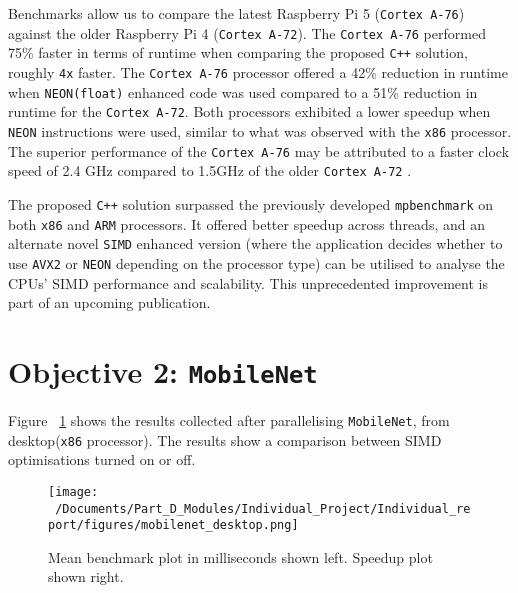 Benchmarks allow us to compare the latest Raspberry Pi 5 (\texttt{Cortex A-76}) against the older Raspberry Pi 4 (\texttt{Cortex A-72}). The \texttt{Cortex A-76} performed 75\% faster in terms of runtime when comparing the proposed \texttt{C++} solution, roughly \texttt{4x} faster. The \texttt{Cortex A-76} processor offered a 42\% reduction in runtime when \texttt{NEON(float)} enhanced code was used compared to a 51\% reduction in runtime for the \texttt{Cortex A-72}. Both processors exhibited a lower speedup when \texttt{NEON} instructions were used, similar to what was observed with the \texttt{x86} processor. The superior performance of the \texttt{Cortex A-76} may be attributed to a faster clock speed of 2.4 GHz compared to 1.5GHz of the older \texttt{Cortex A-72} \cite{rasp_pi5_pi4_comparision}.

The proposed \texttt{C++} solution surpassed the previously developed \texttt{mpbenchmark}\cite{mpbenchmark_paper} on both \texttt{x86} and \texttt{ARM} processors. It offered better speedup across threads, and an alternate novel \texttt{SIMD} enhanced version (where the application decides whether to use \texttt{AVX2} or \texttt{NEON} depending on the processor type) can be utilised to analyse the CPUs' SIMD performance and scalability. This unprecedented improvement is part of an upcoming publication.

\section{Objective 2: \texttt{MobileNet}}

Figure ~\ref{fig:mobilenet_desktop_plot} shows the results collected after parallelising \texttt{MobileNet}, from desktop(\texttt{x86} processor). The results show a comparison between SIMD optimisations turned on or off. 

\begin{figure}[htbp] %
	\centering
	\texttt{[image: ~/Documents/Part\_D\_Modules/Individual\_Project/Individual\_report/figures/mobilenet\_desktop.png]} %
	\caption{Mean benchmark plot in milliseconds shown left. Speedup plot shown right.}
	\label{fig:mobilenet_desktop_plot} %
\end{figure}


